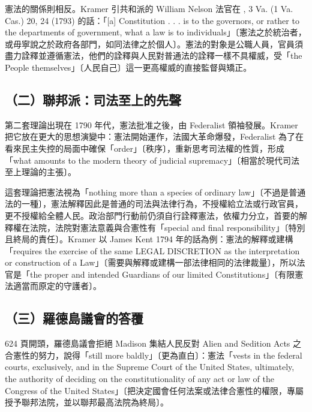 憲法的關係則相反。Kramer 引共和派的 William Nelson 法官在 , 3 Va. (1 Va. Cas.) 20, 24 (1793) 的話：「{[}a{]} Constitution . . . is to the governors, or rather to the departments of government, what a law is to individuals」〔憲法之於統治者，或毋寧說之於政府各部門，如同法律之於個人〕。憲法的對象是公職人員，官員須盡力詮釋並遵循憲法，他們的詮釋與人民對普通法的詮釋一樣不具權威，受「the People themselves」〔人民自己〕這一更高權威的直接監督與矯正。

\subsection{（二）聯邦派：司法至上的先聲}

第二套理論出現在 1790 年代，憲法批准之後，由 Federalist 領袖發展。Kramer 把它放在更大的思想演變中：憲法開始運作，法國大革命爆發，Federalist 為了在看來民主失控的局面中確保「order」〔秩序〕，重新思考司法權的性質，形成「what amounts to the modern theory of judicial supremacy」〔相當於現代司法至上理論的主張〕。

這套理論把憲法視為「nothing more than a species of ordinary law」〔不過是普通法的一種〕，憲法解釋因此是普通的司法與法律行為，不授權給立法或行政官員，更不授權給全體人民。政治部門行動前仍須自行詮釋憲法，依權力分立，首要的解釋權在法院，法院對憲法意義與合憲性有「special and final responsibility」〔特別且終局的責任〕。Kramer 以 James Kent 1794 年的話為例：憲法的解釋或建構「requires the exercise of the same LEGAL DISCRETION as the interpretation or construction of a Law」〔需要與解釋或建構一部法律相同的法律裁量〕，所以法官是「the proper and intended Guardians of our limited Constitutions」〔有限憲法適當而原定的守護者〕。

\subsection{（三）羅德島議會的答覆}

624 頁開頭，羅德島議會拒絕 Madison 集結人民反對 Alien and Sedition Acts 之合憲性的努力，說得「still more baldly」〔更為直白〕：憲法「vests in the federal courts, exclusively, and in the Supreme Court of the United States, ultimately, the authority of deciding on the constitutionality of any act or law of the Congress of the United States」〔把決定國會任何法案或法律合憲性的權限，專屬授予聯邦法院，並以聯邦最高法院為終局〕。

